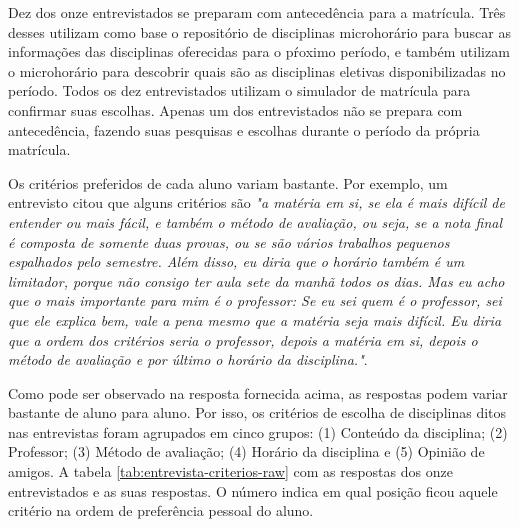 Dez dos onze entrevistados se preparam com antecedência para a matrícula. Três desses utilizam como base o repositório de disciplinas microhorário para buscar as informações das disciplinas oferecidas para o pŕoximo período, e também utilizam o microhorário para descobrir quais são as disciplinas eletivas disponibilizadas no período. Todos os dez entrevistados utilizam o simulador de matrícula para confirmar suas escolhas. Apenas um dos entrevistados não se prepara com antecedência, fazendo suas pesquisas e escolhas durante o período da própria matrícula. 

Os critérios preferidos de cada aluno variam bastante. Por exemplo, um entrevisto citou que alguns critérios são  \textit{"a matéria em si, se ela é mais difícil de entender ou mais fácil, e também o método de avaliação, ou seja, se a nota final é composta de somente duas provas, ou se são vários trabalhos pequenos espalhados pelo semestre. Além disso, eu diria que o horário também é um limitador, porque não consigo ter aula sete da manhã todos os dias. Mas eu acho que o mais importante para mim é o professor: Se eu sei quem é o professor, sei que ele explica bem, vale a pena mesmo que a matéria seja mais difícil. Eu diria que a ordem dos critérios seria o professor, depois a matéria em si, depois o método de avaliação e por último o horário da disciplina."}.

Como pode ser observado na resposta fornecida acima, as respostas podem variar bastante de aluno para aluno. Por isso, os critérios de escolha de disciplinas ditos nas entrevistas foram agrupados em cinco grupos: (1) Conteúdo da disciplina; (2) Professor; (3) Método de avaliação; (4) Horário da disciplina e (5) Opinião de amigos. A tabela \ref{tab:entrevista-criterios-raw} com as respostas dos onze entrevistados e as suas respostas. O número indica em qual posição ficou aquele critério na ordem de preferência pessoal do aluno.

